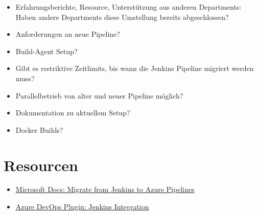 \documentclass{article}
\begin{document}
\begin{itemize}
    \item Erfahrungsberichte, Resource, Unterstützung aus anderen Departments: Haben andere Departments diese Umstellung bereits abgeschlossen?
    \item Anforderungen an neue Pipeline?
    \item Build-Agent Setup?
    \item Gibt es restriktive Zeitlimits, bis wann die Jenkins Pipeline migriert werden muss?
    \item Parallelbetrieb von alter und neuer Pipeline möglich?
    \item Dokumentation zu aktuellem Setup?
    \item Docker Builds?
\end{itemize}

\section*{Resourcen}

\begin{itemize}
    \item \href{https://learn.microsoft.com/en-us/azure/devops/pipelines/migrate/from-jenkins?view=azure-devops}{Microsoft Docs: Migrate from Jenkins to Azure Pipelines}
    \item \href{https://marketplace.visualstudio.com/items?itemName=ms-vsts.services-jenkins}{Azure DevOps Plugin: Jenkins Integration}
\end{itemize}
\end{document}
